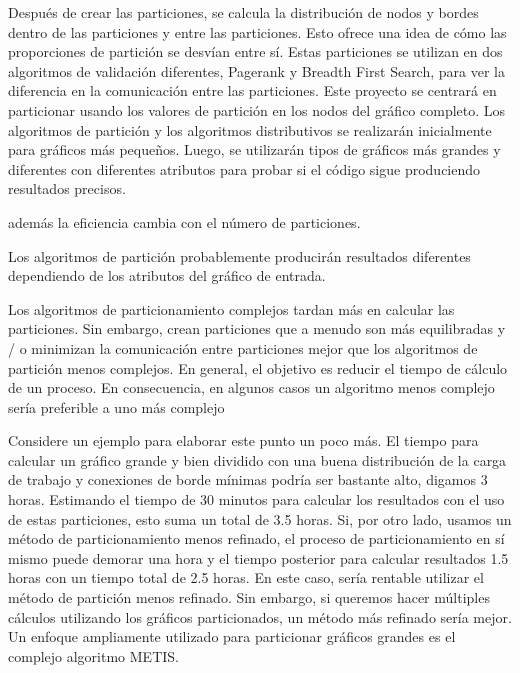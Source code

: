 Después de crear las particiones, se calcula la distribución de nodos y bordes dentro de las particiones y entre las particiones. Esto ofrece una idea de cómo las proporciones de partición se desvían entre sí. Estas particiones se utilizan en dos algoritmos de validación diferentes, Pagerank y Breadth First Search, para ver la diferencia en la comunicación entre las particiones.
Este proyecto se centrará en particionar usando los valores de partición en los nodos del gráfico completo.
Los algoritmos de partición y los algoritmos distributivos se realizarán inicialmente para gráficos más pequeños. Luego, se utilizarán tipos de gráficos más grandes y diferentes con diferentes atributos para probar si el código
sigue produciendo resultados precisos.

además la eficiencia cambia con el número de particiones.

Los algoritmos de partición probablemente producirán resultados diferentes dependiendo de los atributos del gráfico de entrada.

Los algoritmos de particionamiento complejos tardan más en calcular las particiones. Sin embargo, crean particiones que a menudo son más equilibradas y / o minimizan la comunicación entre particiones mejor que los algoritmos de partición menos complejos. En general, el objetivo es reducir el tiempo de cálculo
de un proceso. En consecuencia, en algunos casos un algoritmo menos complejo sería preferible a uno más complejo


Considere un ejemplo para elaborar este punto un poco más. El tiempo para calcular un gráfico grande y bien dividido con una buena distribución de la carga de trabajo y conexiones de borde mínimas podría ser bastante alto, digamos 3 horas. Estimando el tiempo de 30 minutos para calcular los resultados con el uso de estas particiones, esto suma un total de 3.5 horas. Si, por otro lado, usamos un método de particionamiento menos refinado, el proceso de particionamiento en sí mismo puede demorar una hora y el tiempo posterior
para calcular resultados 1.5 horas con un tiempo total de 2.5 horas. En este caso, sería rentable utilizar el método de partición menos refinado. Sin embargo, si queremos hacer múltiples cálculos utilizando los gráficos particionados, un método más refinado sería mejor. Un enfoque ampliamente utilizado para particionar gráficos grandes es el complejo algoritmo METIS.
